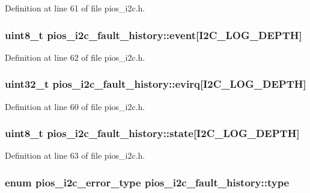 \-Definition at line 61 of file pios\-\_\-i2c.\-h.

\hypertarget{structpios__i2c__fault__history_a1c5b34cc902d5ba1916914dc3cf7d5ba}{
\subsubsection[{event}]{\setlength{\rightskip}{0pt plus 5cm}uint8\-\_\-t {\bf pios\-\_\-i2c\-\_\-fault\-\_\-history\-::event}\mbox{[}\-I2\-C\-\_\-\-L\-O\-G\-\_\-\-D\-E\-P\-T\-H\mbox{]}}}\label{structpios__i2c__fault__history_a1c5b34cc902d5ba1916914dc3cf7d5ba}


\-Definition at line 62 of file pios\-\_\-i2c.\-h.

\hypertarget{structpios__i2c__fault__history_a77d686b8830f4fa32f9a2930df82be4d}{
\subsubsection[{evirq}]{\setlength{\rightskip}{0pt plus 5cm}uint32\-\_\-t {\bf pios\-\_\-i2c\-\_\-fault\-\_\-history\-::evirq}\mbox{[}\-I2\-C\-\_\-\-L\-O\-G\-\_\-\-D\-E\-P\-T\-H\mbox{]}}}\label{structpios__i2c__fault__history_a77d686b8830f4fa32f9a2930df82be4d}


\-Definition at line 60 of file pios\-\_\-i2c.\-h.

\hypertarget{structpios__i2c__fault__history_aac4337b23aad02daaa33f5be193ea859}{
\subsubsection[{state}]{\setlength{\rightskip}{0pt plus 5cm}uint8\-\_\-t {\bf pios\-\_\-i2c\-\_\-fault\-\_\-history\-::state}\mbox{[}\-I2\-C\-\_\-\-L\-O\-G\-\_\-\-D\-E\-P\-T\-H\mbox{]}}}\label{structpios__i2c__fault__history_aac4337b23aad02daaa33f5be193ea859}


\-Definition at line 63 of file pios\-\_\-i2c.\-h.

\hypertarget{structpios__i2c__fault__history_af6d40156bcea64ae98966b65f779dccb}{
\subsubsection[{type}]{\setlength{\rightskip}{0pt plus 5cm}enum {\bf pios\-\_\-i2c\-\_\-error\-\_\-type} {\bf pios\-\_\-i2c\-\_\-fault\-\_\-history\-::type}}}\label{structpios__i2c__fault__history_af6d40156bcea64ae98966b65f779dccb}


